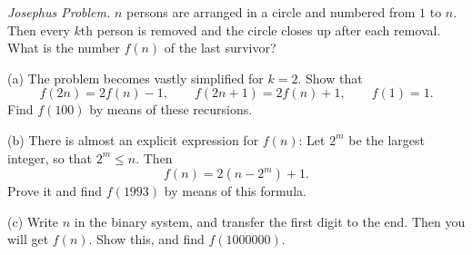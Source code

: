 \emph{Josephus Problem.} $n$ persons are arranged in a circle and numbered from $1$ to $n$. Then every $k$th person is removed and the circle closes up after each removal. What is the number $f(n)$ of the last survivor?

(a) The problem becomes vastly simplified for $k = 2$. Show that
\[ f(2n) = 2f(n) - 1,\qquad f(2n+1) = 2f(n) + 1,\qquad f(1) = 1. \]
Find $f(100)$ by means of these recursions.

(b) There is almost an explicit expression for $f(n)$: Let $2^m$ be the largest integer, so that $2^m \leq n$. Then
\[ f(n) = 2(n - 2^m) + 1. \]
Prove it and find $f(1993)$ by means of this formula.

(c) Write $n$ in the binary system, and transfer the first digit to the end. Then you will get $f(n)$. Show this, and find $f(1000000)$.
